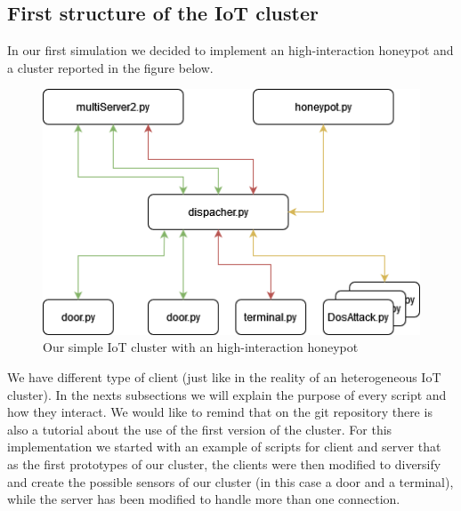 \subsection{ First structure of the IoT cluster}
In our first simulation we decided to implement an high-interaction honeypot and a cluster reported in the figure below.
\begin{figure}[h!]
  \centering
  \includegraphics[width = 12cm]{images/HighInterationHoneypot.drawio.png}
  \caption{Our simple IoT cluster with an high-interaction honeypot}
  \label{fig:DosImpl1}
\end{figure}
\FloatBarrier
\noindent
We have different type of client (just like in the reality of an heterogeneous IoT cluster).
In the nexts subsections we will explain the purpose of every script and how they interact. We would like to remind that on the git repository there is also a tutorial about the use of the first version of the cluster.
For this implementation we started with an example of scripts for client and server that as the first prototypes of our cluster, the clients were then modified to diversify and create the possible sensors of our cluster (in this case a door and a terminal), while the server has been modified to handle more than one connection.

